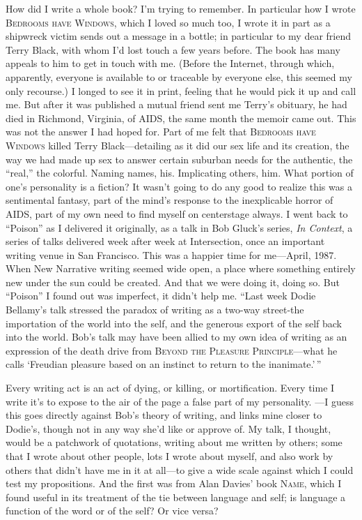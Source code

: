 \documentclass[
]{memoir}
\begin{document}
How did I write a whole book? I'm trying to remember. In particular how
I wrote \textsc{Bedrooms have Windows}, which I loved so much too, I
wrote it in part as a shipwreck victim sends out a message in a bottle;
in particular to my dear friend Terry Black, with whom I'd lost touch a
few years before. The book has many appeals to him to get in touch with
me. (Before the Internet, through which, apparently, everyone is
available to or traceable by everyone else, this seemed my only
recourse.) I longed to see it in print, feeling that he would pick it up
and call me. But after it was published a mutual friend sent me Terry's
obituary, he had died in Richmond, Virginia, of AIDS, the same month the
memoir came out. This was not the answer I had hoped for. Part of me
felt that \textsc{Bedrooms have Windows} killed Terry Black---detailing
as it did our sex life and its creation, the way we had made up sex to
answer certain suburban needs for the authentic, the ``real,'' the
colorful. Naming names, his. Implicating others, him. What portion of
one's personality is a fiction? It wasn't going to do any good to
realize this was a sentimental fantasy, part of the mind's response to
the inexplicable horror of AIDS, part of my own need to find myself on
centerstage always. I went back to ``Poison'' as I delivered it
originally, as a talk in Bob Gluck's series, \emph{In Context}, a series
of talks delivered week after week at Intersection, once an important
writing venue in San Francisco. This was a happier time for me---April,
1987. When New Narrative writing seemed wide open, a place where
something entirely new under the sun could be created. And that we were
doing it, doing so. But ``Poison'' I found out was imperfect, it didn't
help me. ``Last week Dodie Bellamy's talk stressed the paradox of
writing as a two-way street-the importation of the world into the self,
and the generous export of the self back into the world. Bob's talk may
have been allied to my own idea of writing as an expression of the death
drive from \textsc{Beyond the Pleasure Principle}---what he calls
`Freudian pleasure based on an instinct to return to the inanimate.'\,''

Every writing act is an act of dying, or killing, or mortification.
Every time I write it's to expose to the air of the page a false part of
my personality. ---I guess this goes directly against Bob's theory of
writing, and links mine closer to Dodie's, though not in any way she'd
like or approve of. My talk, I thought, would be a patchwork of
quotations, writing about me written by others; some that I wrote about
other people, lots I wrote about myself, and also work by others that
didn't have me in it at all---to give a wide scale against which I could
test my propositions. And the first was from Alan Davies' book
\textsc{Name}, which I found useful in its treatment of the tie between
language and self; is language a function of the word or of the self? Or
vice versa?
\end{document}
